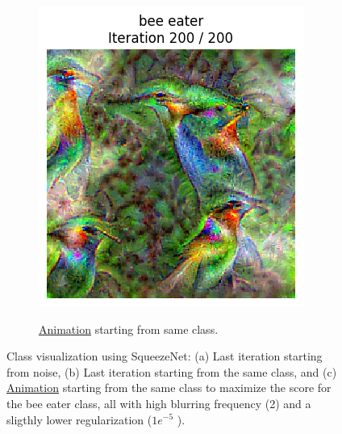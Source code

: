 \begin{figure}[H]
\begin{subfigure}{.33\textwidth}
        \includegraphics[width=\linewidth]{SqueezeNet/bird_animated_same_init_img_reg++_last_frame.png}
        \caption{}
        \label{fig:class_viz_start_image:png}
    \end{subfigure}%
    \begin{subfigure}{.33\textwidth}
        \centering
        \caption{\href{figs/2b/bird_animated_same_init_img_reg++.gif}{Animation} starting from same class.} %
        \label{fig:class_viz_start_image:vid}
    \end{subfigure}
    \caption{Class visualization using SqueezeNet: (a) Last iteration starting from noise, (b) Last iteration starting from the same class, and (c) \href{figs/2b/bird_animated_same_init_img_reg++.gif}{Animation} starting from the same class to maximize the score for the bee eater class, all with high blurring frequency (2) and a sligthly lower regularization ($ 1e^{-5} $ ).}
    \label{fig:class_viz_start_image}
\end{figure}

